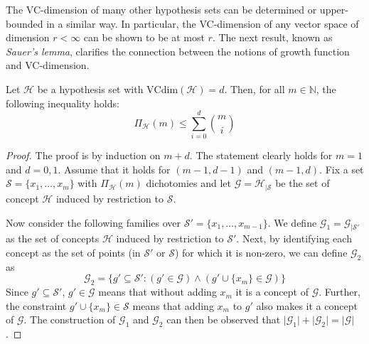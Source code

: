 The VC-dimension of many other hypothesis sets can be determined or upper-bounded in a similar way. In particular, the VC-dimension of any vector space of dimension $r<\infty$ can be shown to be at most $r$. The next result, known as \textit{Sauer's lemma}, clarifies the connection between the notions of growth function and VC-dimension. 
\begin{theorem}
    Let $\mathcal{H}$ be a hypothesis set with $\mathrm{VCdim}(\mathcal{H}) = d$. Then, for all $m\in \mathbb{N}$, the following inequality holds: 
    \begin{equation}
        \Pi_{\mathcal{H}} (m) \leq \sum^{d}_{i=0} {m\choose i}
    \end{equation}
\end{theorem}
\begin{proof}
    The proof is by induction on $m+d$. The statement clearly holds for $m=1$ and $d=0,1$. Assume that it holds for $(m-1,d-1)$ and $(m-1,d)$. Fix a set $\mathcal{S}=\{x_{1},\dots,x_{m}\}$ with $\Pi_{\mathcal{H}}(m)$ dichotomies and let $\mathcal{G}=\mathcal{H}_{|\mathcal{S}}$ be the set of concept $\mathcal{H}$ induced by restriction to $\mathcal{S}$. 

    Now consider the following families over $\mathcal{S}'=\{x_{1},\dots,x_{m-1}\}$. We define $\mathcal{G}_{1}=\mathcal{G}_{|\mathcal{S}'}$ as the set of concepts $\mathcal{H}$ induced by restriction to $\mathcal{S}'$. Next, by identifying each concept as the set of points (in $\mathcal{S}'$ or $\mathcal{S}$) for which it is non-zero, we can define $\mathcal{G}_{2}$ as 
    \begin{equation}
        \mathcal{G}_{2} = \{g'\subseteq \mathcal{S}': (g'\in \mathcal{G})\land (g'\cup \{x_{m}\}\in \mathcal{G})\}
    \end{equation}
    Since $g'\subseteq \mathcal{S}'$, $g'\in \mathcal{G}$ means that without adding $x_m$ it is a concept of $\mathcal{G}$. Further, the constraint $g'\cup \{x_{m}\}\in \mathcal{S}$ means that adding $x_{m}$ to $g'$ also makes it a concept of $\mathcal{G}$. The construction of $\mathcal{G}_{1}$ and $\mathcal{G}_{2}$ can then be observed that $\lvert \mathcal{G}_{1}\rvert + \lvert \mathcal{G}_{2}\rvert = \lvert\mathcal{G}\rvert$. 


\end{proof}
